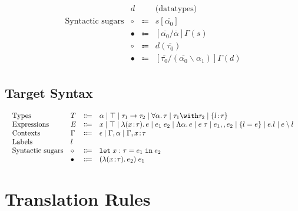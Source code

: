 \documentclass[a4paper]{article}
\begin{document}
\begin{displaymath}
\begin{array}{l}
\begin{array}{llrl}
        & d &  & \text{(datatypes)}\\
        \text{Syntactic sugars} & \circ & \Coloneqq & s[\overline{\alpha_0}] \\
        & \bullet & \Coloneqq & [\overline{\alpha_0}/\overline{\alpha}]\Gamma(s) \\
        & \circ & \Coloneqq & d(\overline{\tau_0}) \\
        & \bullet & \Coloneqq & [\overline{\tau_0}/(\overline{\alpha_0}\backslash\alpha_1)]\Gamma(d)
      \end{array}
    \end{array}
\end{displaymath}

\subsection{Target Syntax}

\begin{displaymath}
    \begin{array}{l}
      \begin{array}{llrl}
        \text{Types}
        & T & \Coloneqq & \alpha \mid \top \mid \tau_1 \to \tau_2 \mid \for \alpha \tau \mid \tau_1 \andop \tau_2 \mid \recty l \tau \\
        \text{Expressions}
        & E & \Coloneqq & x \mid \top \mid \lam x \tau e \mid \app {e_1} {e_2} \mid \blam \alpha e \mid \tapp e \tau \mid e_1 \mergeop e_2 \mid \reccon l e \mid e.l \mid e \restrictop l\\
        \text{Contexts} & \Gamma & \Coloneqq & \epsilon \mid \Gamma, \alpha \mid \Gamma, x \hast \tau \\
        \text{Labels} & l \\
        \text{Syntactic sugars} & \circ & \Coloneqq & \letexpr {x:\tau} {e_1} {e_2} \\
        & \bullet & \Coloneqq & \app {(\lam x \tau {e_2})} {e_1}
      \end{array}
    \end{array}
\end{displaymath}

\section{Translation Rules}

\begin{mathpar}








\end{mathpar}
\end{document}

